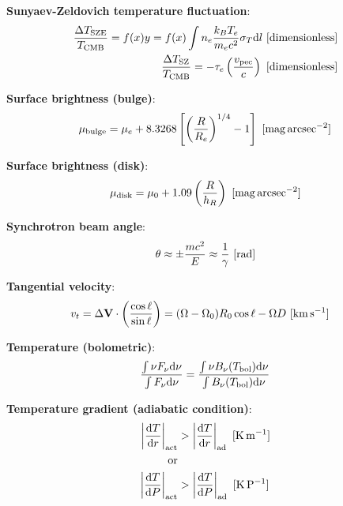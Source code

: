 \documentclass[a4paper,10pt]{article}
\begin{document}
{\noindent}\textbf{Sunyaev-Zeldovich temperature fluctuation}:
\begin{align*}
    \frac{\Delta T_\mathrm{SZE}}{T_\mathrm{CMB}} = f(x)y = f(x)\int n_e\frac{k_BT_e}{m_ec^2}\sigma_T \mathrm{d}l ~ [{\rm dimensionless}] \\
    \frac{\Delta T_\mathrm{SZ}}{T_\mathrm{CMB}} = -\tau_e \left(\frac{v_\mathrm{pec}}{c}\right) ~ [{\rm dimensionless}]
\end{align*}

{\noindent}\textbf{Surface brightness (bulge)}:
\begin{align*}
    \mu_\mathrm{bulge} = \mu_e + 8.3268\left[\left(\frac{R}{R_e}\right)^{1/4}-1\right] ~ [{\rm mag\,arcsec^{-2}}]
\end{align*}

{\noindent}\textbf{Surface brightness (disk)}:
\begin{align*}
    \mu_\mathrm{disk} = \mu_0 + 1.09\left(\frac{R}{h_R}\right) ~ {\rm [mag\,arcsec^{-2}}]
\end{align*}

{\noindent}\textbf{Synchrotron beam angle}:
\begin{align*}
    \theta \approx \pm \frac{mc^2}{E} \approx \frac{1}{\gamma} ~ [{\rm rad}]
\end{align*}

{\noindent}\textbf{Tangential velocity}:
\begin{align*}
    v_t &= \Delta\mathbf{V}\cdot\left(\frac{\cos\ell}{\sin\ell}\right) = (\Omega-\Omega_0)R_0\cos\ell - \Omega D ~ [{\rm km\,s^{-1}}]
\end{align*}

{\noindent}\textbf{Temperature (bolometric)}:
\begin{align*}
    \frac{\int\nu F_\nu {\rm d}\nu}{\int F_\nu {\rm d}\nu} = \frac{\int\nu B_\nu(T_{\rm bol}){\rm d}\nu}{\int B_\nu(T_{\rm bol}){\rm d}\nu}
\end{align*}

{\noindent}\textbf{Temperature gradient (adiabatic condition)}:
\begin{align*}
    \left\lvert\frac{{\rm d}T}{{\rm d}r}\right\rvert_{\rm act} &> \left\lvert\frac{{\rm d}T}{{\rm d}r}\right\rvert_{\rm ad} ~ [{\rm K\,m^{-1}}] \\
    {\rm or} \\
    \left\lvert\frac{{\rm d}T}{{\rm d}P}\right\rvert_{\rm act} &> \left\lvert\frac{{\rm d}T}{{\rm d}P}\right\rvert_{\rm ad} ~ [{\rm K\,P^{-1}}]
\end{align*}
\end{document}
